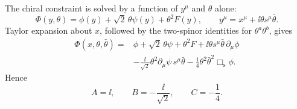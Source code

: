 \begin{enumerate}
\begin{enumerate}
      The chiral constraint is solved by a function of \(y^\mu\) and
      \(\theta\) alone:
      \[
        \Phi(y,\theta)=\phi(y)+\sqrt2\,\theta\psi(y)+\theta^2F(y),
        \qquad y^\mu=x^\mu+\ii\theta s^\mu\bar\theta.
      \]
      Taylor expansion about \(x\), followed by the two-spinor identities
      for \(\theta^a\theta^b\), gives
      \[
      \begin{aligned}
        \Phi(x,\theta,\bar\theta)={}&
          \phi+\sqrt2\,\theta\psi+\theta^2F
          +\ii\theta s^\mu\bar\theta\,\partial_\mu\phi\\
        &-\frac{\ii}{\sqrt2}\theta^2
           \partial_\mu\psi\,s^\mu\bar\theta
          -\frac14\theta^2\bar\theta^2
           \Box_{\mathrm s}\phi .
      \end{aligned}
      \]
      Hence
      \[
        A=\ii,\qquad B=-\frac{\ii}{\sqrt2},\qquad C=-\frac14.
      \]


\end{enumerate}
\end{enumerate}
